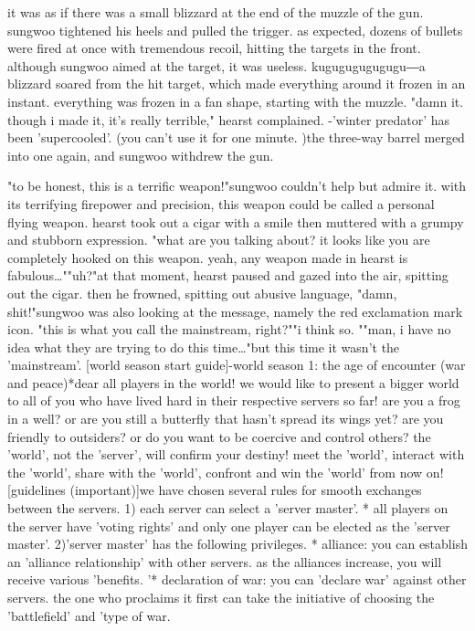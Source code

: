  it was as if there was a small blizzard at the end of the muzzle of the gun.
 sungwoo tightened his heels and pulled the trigger.
as expected, dozens of bullets were fired at once with tremendous recoil, hitting the targets in the front.
 although sungwoo aimed at the target, it was useless.
 kugugugugugugu―a blizzard soared from the hit target, which made everything around it frozen in an instant.
 everything was frozen in a fan shape, starting with the muzzle.
"damn it.
 though i made it, it's really terrible," hearst complained.
 -'winter predator' has been 'supercooled'.
 (you can't use it for one minute.
)the three-way barrel merged into one again, and sungwoo withdrew the gun.

"to be honest, this is a terrific weapon!"sungwoo couldn't help but admire it.
 with its terrifying firepower and precision, this weapon could be called a personal flying weapon.
hearst took out a cigar with a smile then muttered with a grumpy and stubborn expression.
"what are you talking about? it looks like you are completely hooked on this weapon.
 yeah, any weapon made in hearst is fabulous…""uh?"at that moment, hearst paused and gazed into the air, spitting out the cigar.
 then he frowned, spitting out abusive language, "damn, shit!"sungwoo was also looking at the message, namely the red exclamation mark icon.
"this is what you call the mainstream, right?""i think so.
""man, i have no idea what they are trying to do this time…"but this time it wasn't the 'mainstream'.
[world season start guide]-world season 1: the age of encounter (war and peace)*dear all players in the world! we would like to present a bigger world to all of you who have lived hard in their respective servers so far! are you a frog in a well? or are you still a butterfly that hasn't spread its wings yet? are you friendly to outsiders? or do you want to be coercive and control others? the 'world', not the 'server', will confirm your destiny! meet the 'world', interact with the 'world', share with the 'world', confront and win the 'world' from now on![guidelines (important)]we have chosen several rules for smooth exchanges between the servers.
1) each server can select a 'server master'.
* all players on the server have 'voting rights' and only one player can be elected as the 'server master'.
2)'server master' has the following privileges.
* alliance: you can establish an 'alliance relationship' with other servers.
 as the alliances increase, you will receive various 'benefits.
'* declaration of war: you can 'declare war' against other servers.
 the one who proclaims it first can take the initiative of choosing the 'battlefield' and 'type of war.
